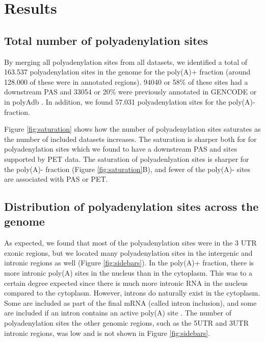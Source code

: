 \section{Results}
\subsection{Total number of polyadenylation sites}
By merging all polyadenylation sites from all datasets, we identified a total
of 163.537 polyadenylation sites in the genome for the poly(A)+ fraction
(around 128.000 of these were in annotated regions). 94040 or 58\% of these
sites had a downstream PAS and 33054 or 20\% were previously annotated in
GENCODE or in polyAdb \cite{lee_polya_db_2007}. In addition, we found 57.031
polyadenylation sites for the poly(A)- fraction.

Figure \ref{fig:saturation} shows how the number of polyadenylation sites
saturates as the number of included datasets increases. The saturation is
sharper both for for polyadenylation sites which we found to have a downstream
PAS and sites supported by PET data. The saturation of polyadenlyation sites is
sharper for the poly(A)- fraction (Figure \ref{fig:saturation}B), and fewer of
the poly(A)- sites are associated with PAS or PET.

\subsection{Distribution of polyadenylation sites across the genome}
As expected, we found that most of the polyadenylation sites were in the 3\p
UTR exonic regions, but we located many polyadenylation sites in the intergenic
and intronic regions as well (Figure \ref{fig:sidebars}). In the poly(A)+
fraction, there is more intronic poly(A) sites in the nucleus than in the
cytoplasm. This was to a certain degree expected since there is much more
intronic RNA in the nucleus compared to the cytoplasm. However, introns do
naturally exist in the cytoplasm. Some are included as part of the final mRNA
(called intron inclusion), and some are included if an intron contains an
active poly(A) site \cite{tian_widespread_2007}. The number of polyadenylation
sites the other genomic regions, such as the 5\p UTR and 3\p UTR intronic
regions, was low and is not shown in Figure \ref{fig:sidebars}.

